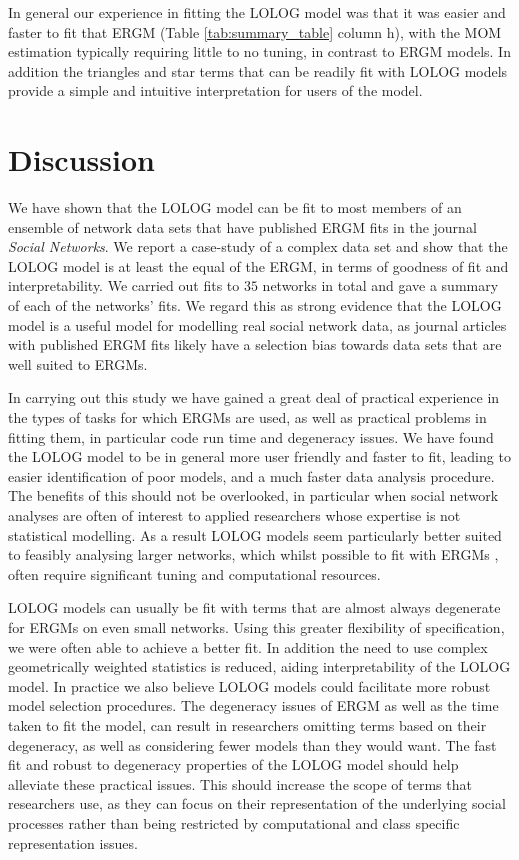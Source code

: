 \documentclass[
]{statsoc}
\begin{document}
In general our experience in fitting the LOLOG model was that it was
easier and faster to fit that ERGM (Table \ref{tab:summary_table} column
h), with the MOM estimation typically requiring little to no tuning, in
contrast to ERGM models. In addition the triangles and star terms that
can be readily fit with LOLOG models provide a simple and intuitive
interpretation for users of the model.

\section{Discussion}\label{sec:discussion}

We have shown that the LOLOG model can be fit to most members of an
ensemble of network data sets that have published ERGM fits in the
journal \textit{Social Networks}. We report a case-study of a complex
data set and show that the LOLOG model is at least the equal of the
ERGM, in terms of goodness of fit and interpretability. We carried out
fits to \(35\) networks in total and gave a summary of each of the
networks' fits. We regard this as strong evidence that the LOLOG model
is a useful model for modelling real social network data, as journal
articles with published ERGM fits likely have a selection bias towards
data sets that are well suited to ERGMs.

In carrying out this study we have gained a great deal of practical
experience in the types of tasks for which ERGMs are used, as well as
practical problems in fitting them, in particular code run time and
degeneracy issues. We have found the LOLOG model to be in general more
user friendly and faster to fit, leading to easier identification of
poor models, and a much faster data analysis procedure. The benefits of
this should not be overlooked, in particular when social network
analyses are often of interest to applied researchers whose expertise is
not statistical modelling. As a result LOLOG models seem particularly
better suited to feasibly analysing larger networks, which whilst
possible to fit with ERGMs \citep{stivala2020}, often require
significant tuning and computational resources.

LOLOG models can usually be fit with terms that are almost always
degenerate for ERGMs on even small networks. Using this greater
flexibility of specification, we were often able to achieve a better
fit. In addition the need to use complex geometrically weighted
statistics is reduced, aiding interpretability of the LOLOG model. In
practice we also believe LOLOG models could facilitate more robust model
selection procedures. The degeneracy issues of ERGM as well as the time
taken to fit the model, can result in researchers omitting terms based
on their degeneracy, as well as considering fewer models than they would
want. The fast fit and robust to degeneracy properties of the LOLOG
model should help alleviate these practical issues. This should increase
the scope of terms that researchers use, as they can focus on their
representation of the underlying social processes rather than being
restricted by computational and class specific representation issues.
\end{document}
